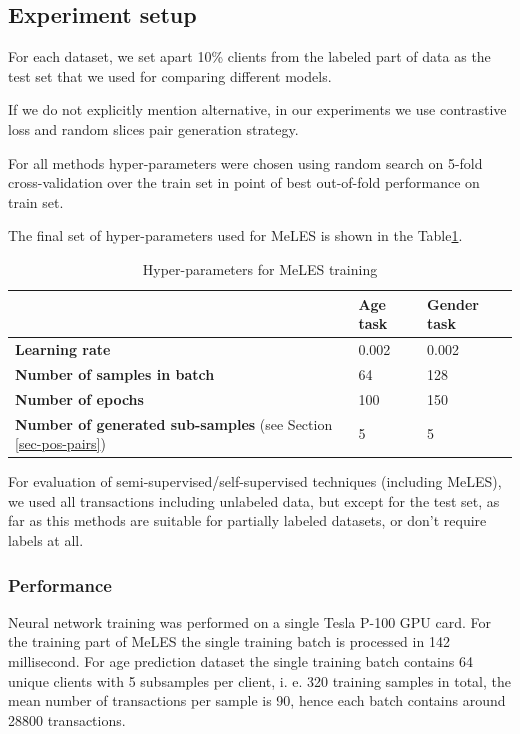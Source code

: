 \documentclass[sigconf, anonymous]{acmart}
\begin{document}
\subsection{Experiment setup}

For each dataset, we set apart 10\% clients from the labeled part of data as the test set that we used for comparing different models.

If we do not explicitly mention alternative, in our experiments we use contrastive loss and random slices pair generation strategy.

For all methods hyper-parameters were chosen using random search on 5-fold cross-validation over the train set in point of best out-of-fold performance on train set.

The final set of hyper-parameters used for MeLES is shown in the Table\ref{tab-hyper}.

\begin{table}[ht]
\caption{Hyper-parameters for MeLES training}
\begin{tabular}{ | m{18em} |  m{3em} | m{3em} | }
\hline
& \textbf{Age task} & \textbf{Gender task} \\
\hline
\textbf{Learning rate} & 0.002 & 0.002 \\
\textbf{Number of samples in batch} & 64 & 128 \\
\textbf{Number of epochs} & 100 & 150 \\
\textbf{Number of generated sub-samples} (see Section \ref{sec-pos-pairs}) & 5 & 5 \\
\hline
\end{tabular}
\label{tab-hyper}
\end{table}

For evaluation of semi-supervised/self-supervised techniques (including MeLES), we used all transactions including unlabeled data, but except for the test set, as far as this methods are suitable for partially labeled datasets, or don't require labels at all.

\subsubsection{Performance}

Neural network training was performed on a single Tesla P-100 GPU card. For the training part of MeLES the single training batch is processed in 142 millisecond. For age prediction dataset the single training batch contains 64 unique clients with 5 subsamples per client, i. e. 320 training samples in total, the mean number of transactions per sample is 90, hence each batch contains around 28800 transactions.
\end{document}
